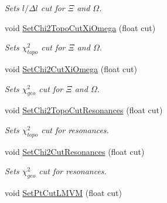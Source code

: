 \begin{DoxyCompactItemize}
\begin{DoxyCompactList}\small\item\em Sets $l/\Delta l$ cut for $\Xi$ and $\Omega$. \end{DoxyCompactList}\item 
void \hyperlink{classKFParticleFinder_abc001f02cf7e019fde933926deb47af4}{Set\+Chi2\+Topo\+Cut\+Xi\+Omega} (float cut)\hypertarget{classKFParticleFinder_abc001f02cf7e019fde933926deb47af4}{}\label{classKFParticleFinder_abc001f02cf7e019fde933926deb47af4}

\begin{DoxyCompactList}\small\item\em Sets $\chi^2_{topo}$ cut for $\Xi$ and $\Omega$. \end{DoxyCompactList}\item 
void \hyperlink{classKFParticleFinder_a1dac1e6944f049221c09d1aec232d580}{Set\+Chi2\+Cut\+Xi\+Omega} (float cut)\hypertarget{classKFParticleFinder_a1dac1e6944f049221c09d1aec232d580}{}\label{classKFParticleFinder_a1dac1e6944f049221c09d1aec232d580}

\begin{DoxyCompactList}\small\item\em Sets $\chi^2_{geo}$ cut for $\Xi$ and $\Omega$. \end{DoxyCompactList}\item 
void \hyperlink{classKFParticleFinder_a6124ff25f4485ba381c8d41c5898bdc2}{Set\+Chi2\+Topo\+Cut\+Resonances} (float cut)\hypertarget{classKFParticleFinder_a6124ff25f4485ba381c8d41c5898bdc2}{}\label{classKFParticleFinder_a6124ff25f4485ba381c8d41c5898bdc2}

\begin{DoxyCompactList}\small\item\em Sets $\chi^2_{topo}$ cut for resonances. \end{DoxyCompactList}\item 
void \hyperlink{classKFParticleFinder_a2501a7c09b98feb34d029544351d4ae9}{Set\+Chi2\+Cut\+Resonances} (float cut)\hypertarget{classKFParticleFinder_a2501a7c09b98feb34d029544351d4ae9}{}\label{classKFParticleFinder_a2501a7c09b98feb34d029544351d4ae9}

\begin{DoxyCompactList}\small\item\em Sets $\chi^2_{geo}$ cut for resonances. \end{DoxyCompactList}\item 
void \hyperlink{classKFParticleFinder_ac7e7f1066610e45f2d105712a8e61dd9}{Set\+Pt\+Cut\+L\+M\+VM} (float cut)\hypertarget{classKFParticleFinder_ac7e7f1066610e45f2d105712a8e61dd9}{}\label{classKFParticleFinder_ac7e7f1066610e45f2d105712a8e61dd9}


\end{DoxyCompactItemize}
